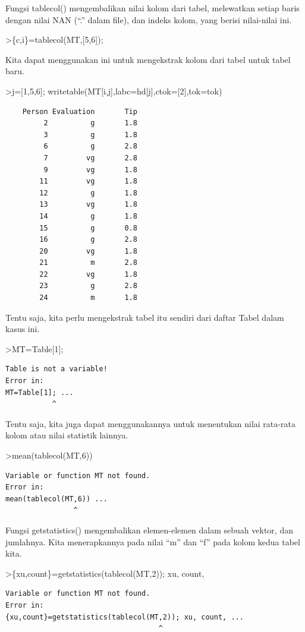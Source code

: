 \documentclass[
]{book}
\begin{document}
Fungsi tablecol() mengembalikan nilai kolom dari tabel, melewatkan setiap baris dengan nilai NAN (``.'' dalam file), dan indeks kolom, yang berisi nilai-nilai ini.

\textgreater\{c,i\}=tablecol(MT,{[}5,6{]});

Kita dapat menggunakan ini untuk mengekstrak kolom dari tabel untuk tabel baru.

\textgreater j={[}1,5,6{]}; writetable(MT{[}i,j{]},labc=hd{[}j{]},ctok={[}2{]},tok=tok)

\begin{verbatim}
    Person Evaluation       Tip
         2          g       1.8
         3          g       1.8
         6          g       2.8
         7         vg       2.8
         9         vg       1.8
        11         vg       1.8
        12          g       1.8
        13         vg       1.8
        14          g       1.8
        15          g       0.8
        16          g       2.8
        20         vg       1.8
        21          m       2.8
        22         vg       1.8
        23          g       2.8
        24          m       1.8
\end{verbatim}

Tentu saja, kita perlu mengekstrak tabel itu sendiri dari daftar Tabel dalam kasus ini.

\textgreater MT=Table{[}1{]};

\begin{verbatim}
Table is not a variable!
Error in:
MT=Table[1]; ...
           ^
\end{verbatim}

Tentu saja, kita juga dapat menggunakannya untuk menentukan nilai rata-rata kolom atau nilai statistik lainnya.

\textgreater mean(tablecol(MT,6))

\begin{verbatim}
Variable or function MT not found.
Error in:
mean(tablecol(MT,6)) ...
                ^
\end{verbatim}

Fungsi getstatistics() mengembalikan elemen-elemen dalam sebuah vektor, dan jumlahnya. Kita menerapkannya pada nilai ``m'' dan ``f'' pada kolom kedua tabel kita.

\textgreater\{xu,count\}=getstatistics(tablecol(MT,2)); xu, count,

\begin{verbatim}
Variable or function MT not found.
Error in:
{xu,count}=getstatistics(tablecol(MT,2)); xu, count, ...
                                    ^
\end{verbatim}
\end{document}
